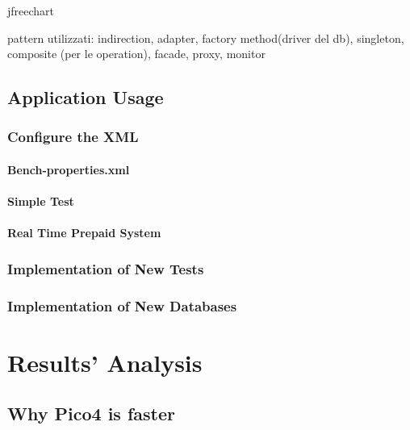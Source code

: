 		jfreechart
		
		pattern utilizzati: indirection, adapter, factory method(driver del db), singleton, 
		composite (per le operation), facade, proxy, monitor
	
	\section{Application Usage}
		\subsection{Configure the XML}
			\subsubsection{Bench-properties.xml}
			\subsubsection{Simple Test}
			\subsubsection{Real Time Prepaid System}
			
		\subsection{Implementation of New Tests}%
		\subsection{Implementation of New Databases}%


\chapter{Results' Analysis}
	\section{Why Pico4 is faster}
